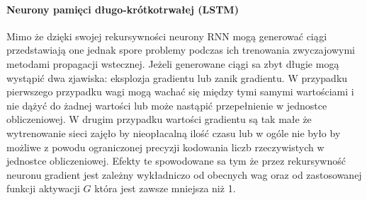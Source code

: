 \paragraph{Neurony pamięci długo-krótkotrwałej (LSTM)}
Mimo że dzięki swojej rekursywności neurony RNN mogą generować ciągi przedstawiają one jednak spore problemy podczas ich trenowania zwyczajowymi metodami propagacji wstecznej. Jeżeli generowane ciągi sa zbyt długie mogą wystąpić dwa zjawiska: eksplozja gradientu lub zanik gradientu. W przypadku pierwszego przypadku wagi mogą wachać się między tymi samymi wartościami i nie dążyć do żadnej wartości lub może nastąpić przepełnienie w jednostce obliczeniowej. W drugim przypadku wartości gradientu są tak małe że wytrenowanie sieci zajęło by nieopłacalną ilość czasu lub w ogóle nie było by możliwe z powodu ograniczonej precyzji kodowania liczb rzeczywistych w jednostce obliczeniowej. Efekty te spowodowane sa tym że przez rekursywność neuronu gradient jest zależny wykładniczo od obecnych wag oraz od zastosowanej funkcji aktywacji $G$ która jest zawsze mniejsza niż 1.\cite[p.~18]{LSTM-intro}

